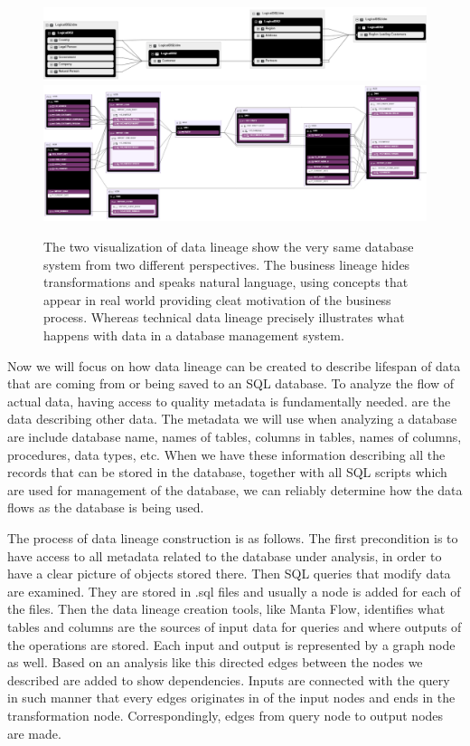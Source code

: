 \begin{figure}[H]
	\centering
	\includegraphics[width=14cm]{../img/BusinessLineage}
	\includegraphics[width=14cm]{../img/TechnicalLineage}
	\caption[Technical Lineage versus Business Lineage]{The two visualization of data lineage show the very same database system from two different perspectives. The business lineage hides transformations and speaks natural language, using concepts that appear in real world providing cleat motivation of the business process. 
		Whereas technical data lineage precisely illustrates what happens with data in a database management system.}
	\label{BusinessVsTechnicalLineage}
\end{figure}

Now we will focus on how data lineage can be created to describe lifespan of data that are coming from or being saved to an SQL database.
To analyze the flow of actual data, having access to quality metadata is fundamentally needed.
 are the data describing other data. The metadata we will use when analyzing a database are include database name, names of tables, columns in tables, names of columns, procedures, data types, etc.
When we have these information describing all the records that can be stored in the database, together with all SQL scripts which are used for management of the database, we can reliably determine how the data flows as the database is being used.

The process of data lineage construction is as follows. The first precondition is to have access to all metadata related to the database under analysis, in order to have a clear picture of objects stored there. 
Then SQL queries that modify data are examined. They are stored in .sql files and usually a node is added for each of the files. Then the data lineage creation tools, like Manta Flow, identifies what tables and columns are the sources of input data for queries and where outputs of the operations are stored. Each input and output is represented by a graph node as well. Based on an analysis like this directed edges between the nodes we described are added to show dependencies. Inputs are connected with the query in such manner that every edges originates in of the input nodes and ends in the transformation node. Correspondingly, edges from query node to output nodes are made.


